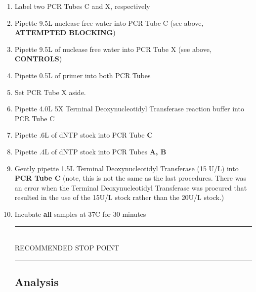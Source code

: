 \documentclass[letterpaper]{article}
\newcommand{\tdt}{Terminal Deoxynucleotidyl Transferase}
\newcommand{\C}{\degree{}C}
\newcommand{\uL}{\micro{}L}
\newcommand{\RstopPoint}{\begin{center}
\rule{0.5\textwidth}{.4mm}\\
\vspace{1mm} 
RECOMMENDED STOP POINT\\
\rule{0.5\textwidth}{.4mm}
\end{center}}
\begin{document}
\begin{enumerate}
\subsection{Extending}
Based off of our standard \tdt{} extending procedure \cite{genTdT}.
\item{Label two PCR Tubes C and X, respectively}
\item{Pipette 9.5\uL{} nuclease free water into PCR Tube C (see above, \textbf{ATTEMPTED BLOCKING})}
\item{Pipette 9.5\uL{} of nuclease free water into PCR Tube X (see above, \textbf{CONTROLS})}
\item{Pipette 0.5\uL{} of primer into both PCR Tubes}
\item{Set PCR Tube X aside.}
\item{Pipette 4.0\uL{} 5X \tdt{} reaction buffer into PCR Tube C}
\item{Pipette .6\uL{} of dNTP stock into PCR Tube \textbf{C}}
\item{Pipette .4\uL{} of dNTP stock into PCR Tubes \textbf{A, B}}
\item{Gently pipette 1.5\uL{} \tdt{} (15 U/\uL{}) into \textbf{PCR Tube C} (note, this is not the same as the last procedures. There was an error when the \tdt{} was procured that resulted in the use of the 15U/\uL{} stock rather than the 20U/\uL{} stock.)}
\item{Incubate \textbf{all} samples at 37\C{} for 30 minutes}\\
\RstopPoint{} 
\subsection{Analysis}

\end{enumerate}
\end{document}
